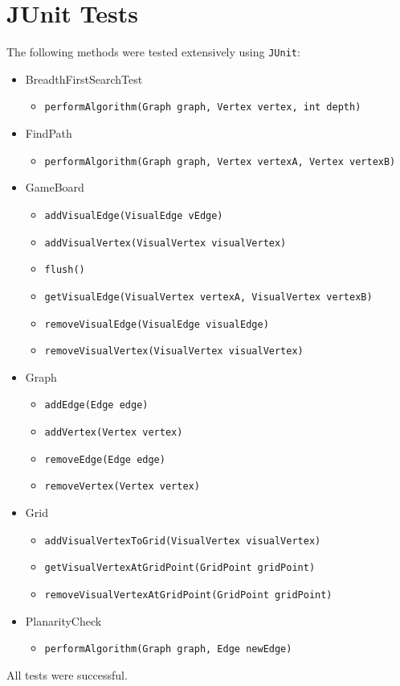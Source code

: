 \section{JUnit Tests}
The following methods were tested extensively using \texttt{JUnit}:


\begin{itemize}
\item BreadthFirstSearchTest
	\begin{itemize}
	\item \texttt{performAlgorithm(Graph graph, Vertex vertex, int depth)}
	\end{itemize}
	
\item FindPath
	\begin{itemize}
	\item \texttt{performAlgorithm(Graph graph, Vertex vertexA, Vertex vertexB)}
	\end{itemize}

\item GameBoard
	\begin{itemize}
	\item \texttt{addVisualEdge(VisualEdge vEdge)}
	\item \texttt{addVisualVertex(VisualVertex visualVertex)}
	\item \texttt{flush()}
	\item \texttt{getVisualEdge(VisualVertex vertexA, VisualVertex vertexB)}
	\item \texttt{removeVisualEdge(VisualEdge visualEdge)}
	\item \texttt{removeVisualVertex(VisualVertex visualVertex)}
	\end{itemize}
	
\item Graph
	\begin{itemize}
	\item \texttt{addEdge(Edge edge)}
	\item \texttt{addVertex(Vertex vertex)}
	\item \texttt{removeEdge(Edge edge)}
	\item \texttt{removeVertex(Vertex vertex)}
	\end{itemize}
	
\item Grid
	\begin{itemize}
	\item \texttt{addVisualVertexToGrid(VisualVertex visualVertex)}
	\item \texttt{getVisualVertexAtGridPoint(GridPoint gridPoint)}
	\item \texttt{removeVisualVertexAtGridPoint(GridPoint gridPoint)}
	\end{itemize}
	
\item PlanarityCheck
	\begin{itemize}
	\item \texttt{performAlgorithm(Graph graph, Edge newEdge)}
	\end{itemize}
\end{itemize}

All tests were successful.